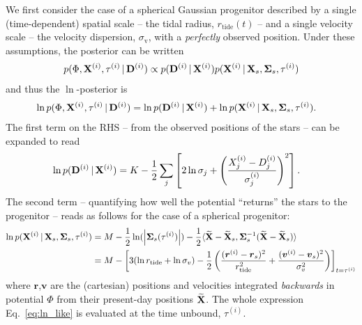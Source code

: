 \documentclass[letterpaper,12pt,preprint]{aastex}
\newcommand{\given}{\,|\,}
\newcommand{\D}{{\bf D}}
\newcommand{\X}{{\bf X}}
\newcommand{\bSigma}{{\bf \Sigma}}
\begin{document}
We first consider the case of a spherical Gaussian progenitor described by a single (time-dependent) spatial scale -- the tidal radius, $r_{\mathrm{tide}}(t)$ -- and a single velocity scale -- the velocity dispersion, $\sigma_\mathrm{v}$, with a \emph{perfectly} observed position. Under these assumptions, the posterior can be written
\begin{align}
	p(\Phi, \X^{(i)}, \tau^{(i)} \given \D^{(i)}) &\propto 
		p(\D^{(i)} \given \X^{(i)}) p(\X^{(i)} \given \X_s, \bSigma_s, \tau^{(i)})\\
\end{align}
and thus the $\ln$-posterior is
\begin{align}
	\ln p(\Phi, \X^{(i)}, \tau^{(i)} \given \D^{(i)}) &= \ln p(\D^{(i)} \given \X^{(i)}) + \ln p(\X^{(i)} \given \X_s, \bSigma_s, \tau^{(i)}).
\end{align}
The first term on the RHS -- from the observed positions of the stars	-- can be expanded to read
\begin{align}
	\ln p(\D^{(i)} \given \X^{(i)}) &= K - \frac{1}{2}\sum_j \left[ 2\ln\sigma_j + \left(\frac{X^{(i)}_j-D^{(i)}_j}{\sigma^{(i)}_j}\right)^2\right].
\end{align}
The second term -- quantifying how well the potential ``returns'' the stars to the progenitor -- reads as follows for the case of a spherical progenitor:
\begin{align}
	\ln p(\X^{(i)} \given \X_s, \bSigma_s, \tau^{(i)}) &= M - \frac{1}{2}\ln(\left\vert\bSigma_s(\tau^{(i)})\right\vert) - \frac{1}{2}\langle \widetilde{\X}-\widetilde{\X}_s, \bSigma_s^{-1}(\widetilde{\X}-\widetilde{\X}_s) \rangle\\
	&= M - \left[3(\ln r_{\rm tide} + \ln \sigma_v) - \frac{1}{2}\left( \frac{({\boldsymbol r}^{(i)}-{\boldsymbol r}_s)^2}{r_{\rm tide}^2} + \frac{ ({\boldsymbol v}^{(i)}-{\boldsymbol v}_s)^2}{\sigma_v^2} \right)\right]_{t=\tau^{(i)}}\label{eq:ln_like}
\end{align}
where $\boldsymbol r$,$\boldsymbol v$ are the (cartesian) positions and velocities integrated \emph{backwards} in potential $\Phi$ from their present-day positions $\widetilde{\X}$. The whole expression Eq.~\ref{eq:ln_like} is evaluated at the time unbound, $\tau^{(i)}$.

\end{document}
